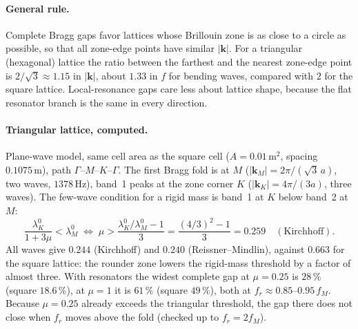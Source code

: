 \paragraph{General rule.} Complete Bragg gaps favor lattices whose
Brillouin zone is as close to a circle as possible, so that all zone-edge
points have similar $|\mathbf{k}|$. For a triangular (hexagonal) lattice the
ratio between the farthest and the nearest zone-edge point is
$2/\sqrt{3} \approx 1.15$ in $|\mathbf{k}|$, about $1.33$ in $f$ for bending
waves, compared with $2$ for the square lattice. Local-resonance gaps care
less about lattice shape, because the flat resonator branch is the same in every
direction.

\paragraph{Triangular lattice, computed.} Plane-wave model, same cell area as the
square cell ($A = 0.01\,\mathrm{m}^2$, spacing $0.1075\,\mathrm{m}$), path
$\Gamma$--$M$--$K$--$\Gamma$. The first Bragg fold is at $M$
($|\mathbf{k}_M| = 2\pi/(\sqrt{3}\,a)$, two waves, $1378\,\mathrm{Hz}$), band~1 peaks
at the zone corner $K$ ($|\mathbf{k}_K| = 4\pi/(3a)$, three waves). The few-wave
condition for a rigid mass is band~1 at $K$ below band~2 at $M$:
\begin{equation}
  \frac{\lambda_K^0}{1 + 3\mu} < \lambda_M^0
  \;\Longleftrightarrow\;
  \mu > \frac{\lambda_K^0/\lambda_M^0 - 1}{3} = \frac{(4/3)^2 - 1}{3} = 0.259
  \quad(\text{Kirchhoff}).
\end{equation}
All waves give $0.244$ (Kirchhoff) and $0.240$ (Reissner--Mindlin), against $0.663$
for the square lattice: the rounder zone lowers the rigid-mass threshold by a factor
of almost three. With resonators the widest complete gap at $\mu = 0.25$ is $28\,\%$
(square $18.6\,\%$), at $\mu = 1$ it is $61\,\%$ (square $49\,\%$), both at
$f_r \approx 0.85$--$0.95\,f_M$. Because $\mu = 0.25$ already exceeds the triangular
threshold, the gap there does not close when $f_r$ moves above the fold
(checked up to $f_r = 2 f_M$).
